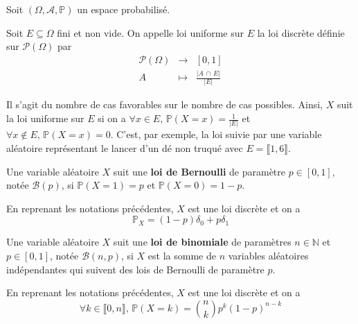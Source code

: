 
  Soit $(\Omega, \mathcal{A}, \mathbb{P})$ un espace probabilisé.

  \begin{definition}
    Soit $E \subseteq \Omega$ fini et non vide. On appelle loi uniforme sur $E$ la loi discrète définie sur $\mathcal{P}(\Omega)$ par
    \[
    \begin{array}{ccc}
      \mathcal{P}(\Omega) &\rightarrow& [0,1] \\
      A &\mapsto& \frac{\vert A \, \cap \, E \vert}{\vert E \vert}
    \end{array}
    \]
  \end{definition}

  \begin{remark}
    Il s'agit du nombre de cas favorables sur le nombre de cas possibles. Ainsi, $X$ suit la loi uniforme sur $E$ si on a $\forall x \in E, \, \mathbb{P}(X=x) = \frac{1}{\vert E \vert}$ et $\forall x \notin E, \, \mathbb{P}(X=x) = 0$.
    \newpar
    C'est, par exemple, la loi suivie par une variable aléatoire représentant le lancer d'un dé non truqué avec $E = \llbracket 1, 6 \rrbracket$.
  \end{remark}

  \begin{definition}
    Une variable aléatoire $X$ suit une \textbf{loi de Bernoulli} de paramètre $p \in [0,1]$, notée $\mathcal{B}(p)$, si $\mathbb{P}(X=1) = p$ et $\mathbb{P}(X=0)=1-p$.
  \end{definition}

  \begin{proposition}
    En reprenant les notations précédentes, $X$ est une loi discrète et on a
    \[ \mathbb{P}_X = (1-p) \delta_0 + p \delta_1 \]
  \end{proposition}

  \begin{definition}
    Une variable aléatoire $X$ suit une \textbf{loi de binomiale} de paramètres $n \in \mathbb{N}$ et $p \in [0,1]$, notée $\mathcal{B}(n, p)$, si $X$ est la somme de $n$ variables aléatoires indépendantes qui suivent des lois de Bernoulli de paramètre $p$.
  \end{definition}

  \begin{proposition}
    En reprenant les notations précédentes, $X$ est une loi discrète et on a
    \[ \forall k \in \llbracket 0,n \rrbracket, \, \mathbb{P}(X = k) = \binom{n}{k} p^k (1-p)^{n-k} \]
  \end{proposition}

